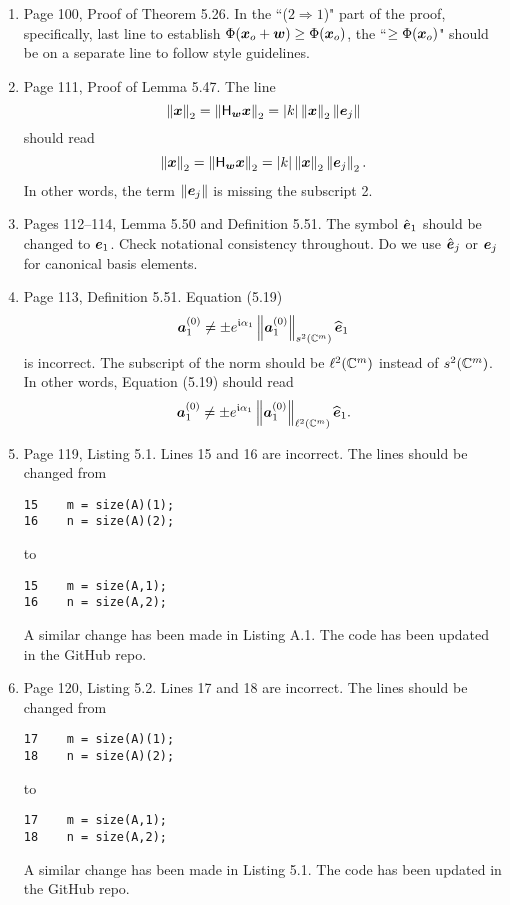 \documentclass{book}
\begin{document}
\begin{enumerate}
	\item
Page 100, Proof of Theorem 5.26. In the ``($2 \Longrightarrow 1$)" part of the  proof, specifically, last line to establish $\Phi(\boldsymbol{x}_o +\boldsymbol{w}) \ge \Phi(\boldsymbol{x}_o)$, the  ``$\ge \Phi(\boldsymbol{x}_o)$" should be on a separate line to follow style guidelines.

	\item
Page 111, Proof of Lemma 5.47. The line
	\[
\left\| \boldsymbol{x} \right\|_2 = \left\| \mathsf{H}_{\boldsymbol{w}}\boldsymbol{x} \right\|_2 = |k|\left\| \boldsymbol{x} \right\|_2\left\| \boldsymbol{e}_j \right\|	
	\]
should read
	\[
\left\| \boldsymbol{x} \right\|_2 = \left\| \mathsf{H}_{\boldsymbol{w}}\boldsymbol{x} \right\|_2 = |k|\left\| \boldsymbol{x} \right\|_2\left\| \boldsymbol{e}_j \right\|_2.	
	\]
In other words, the term $\left\| \boldsymbol{e}_j \right\|$ is missing the subscript 2.

	\item
Pages 112--114, Lemma 5.50 and Definition 5.51. The symbol $\hat{\boldsymbol{e}}_1$ should be changed to $\boldsymbol{e}_1$. Check notational consistency throughout. Do we use $\hat{\boldsymbol{e}}_j$ or $\boldsymbol{e}_j$ for canonical basis elements.

	\item
Page 113, Definition 5.51.  Equation (5.19) 
	\[
  \boldsymbol{a}_1^{(0)} \ne  \pm e^{\mathfrak{i} \alpha_1}\left\| \boldsymbol{a}_1^{(0)} \right\|_{s^2(\mathbb C^m)}\widehat{\boldsymbol{e}}_1 
	\]
is incorrect. The subscript of the norm should be $\ell^2(\mathbb C^m)$ instead of $s^2(\mathbb C^m)$. In other words,  Equation (5.19) should read 
	\[
  \boldsymbol{a}_1^{(0)} \ne  \pm e^{\mathfrak{i} \alpha_1}\left\| \boldsymbol{a}_1^{(0)} \right\|_{\ell^2(\mathbb C^m)}\widehat{\boldsymbol{e}}_1 .
	\]
	
	\item
Page 119, Listing 5.1. Lines 15 and 16 are incorrect. The lines should be changed from
	\begin{verbatim}
15    m = size(A)(1);
16    n = size(A)(2);	
	\end{verbatim}
to 
	\begin{verbatim}
15    m = size(A,1);
16    n = size(A,2);	
	\end{verbatim}
A similar change has been made in Listing A.1. The code has been updated in the GitHub repo.

	\item
Page 120, Listing 5.2. Lines 17 and 18 are incorrect. The lines should be changed from
	\begin{verbatim}
17    m = size(A)(1);
18    n = size(A)(2);	
	\end{verbatim}
to 
	\begin{verbatim}
17    m = size(A,1);
18    n = size(A,2);	
	\end{verbatim}
A similar change has been made in Listing 5.1. The code has been updated in the GitHub repo.

	
	
	\end{enumerate}
	
\end{document}
